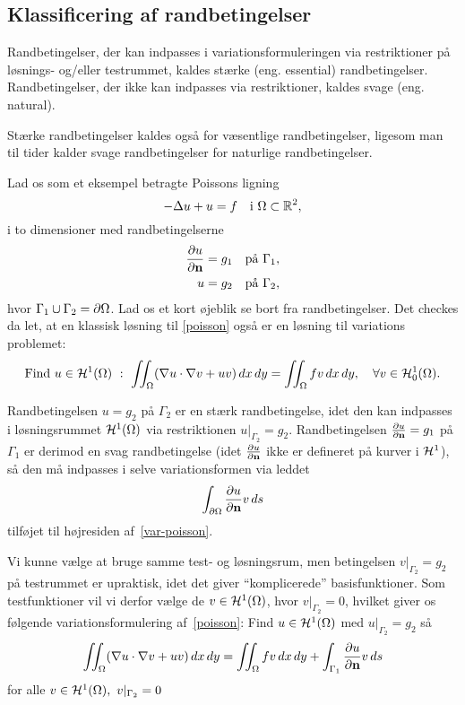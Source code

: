 \subsection{Klassificering af randbetingelser}
\begin{definition}
Randbetingelser, der kan indpasses i variationsformuleringen via
restriktioner på løsnings- og/eller testrummet, kaldes stærke (eng. essential)
randbetingelser. Randbetingelser, der ikke kan indpasses via
restriktioner, kaldes svage (eng. natural).
\end{definition}
\begin{remark}
Stærke randbetingelser kaldes også for væ\-sent\-li\-ge rand\-be\-tin\-gel\-ser,
ligesom man til tider kalder svage randbetingelser for naturlige
randbetingelser. 
\end{remark}
\begin{example}
Lad os som et eksempel betragte Poissons ligning
\begin{equation} \label{poisson}
  -\Delta u+u = f \quad \text{i $\Omega\subset\mathbb{R}^2$},
\end{equation}
i to dimensioner med randbetingelserne
\begin{align}
  \frac{\partial u}{\partial\mathbf{n}} &= g_1 \quad \text{på $\Gamma_1$}, \\
                 u  &= g_2 \quad \text{på $\Gamma_2$},
\end{align}
hvor $\Gamma_1\cup\Gamma_2 = \partial\Omega$.
Lad os et kort øjeblik se bort fra randbetingelser. Det checkes da
let, at en klassisk løsning til \eqref{poisson} også er en løsning til
variations problemet:
\begin{equation} \label{var-poisson}
  \text{Find} \
  u\in\mathcal H^1(\Omega) \ : \
  \iint_{\Omega} (\nabla u \cdot \nabla v + uv)\, dx\, dy =
  \iint_{\Omega} fv\, dx\, dy,
  \quad \forall v\in\mathcal H^1_0(\Omega).
\end{equation}

Randbetingelsen $u=g_2$ på $\Gamma_2$ er en stærk randbetingelse, idet
den kan indpasses i løsningsrummet ${\mathcal H}^1(\Omega)$ via restriktionen 
$u|_{\Gamma_2}=g_2$. Randbetingelsen $\frac{\partial u}{\partial \mathbf{n}}=g_1$ på $\Gamma_1$ er
derimod en svag randbetingelse (idet $\frac{\partial u}{\partial \mathbf{n}}$ ikke er defineret
på kurver i $\mathcal H^1$), så den må indpasses i selve variationsformen via leddet 
\begin{equation}
  \int_{\partial \Omega} \frac{\partial u}{\partial \mathbf{n}}v\, ds
\end{equation}
tilføjet til højresiden af~\eqref{var-poisson}. 

Vi kunne vælge at bruge samme test- og løsningsrum, men betingelsen
$v|_{\Gamma_2}=g_2$ på testrummet er upraktisk, idet det giver 
``komplicerede'' basisfunktioner. Som testfunktioner vil vi derfor vælge
de $v\in {\mathcal H}^1(\Omega)$, hvor $v|_{\Gamma_2}=0$, hvilket giver os følgende 
variationsformulering af~\eqref{poisson}: Find $u\in {\mathcal H}^1(\Omega)$ med $u|_{\Gamma_2}=g_2$ så
\begin{equation}
  \iint_{\Omega} (\nabla u \cdot \nabla v + uv)\, dx\, dy =
  \iint_{\Omega} fv\, dx\, dy +
  \int_{\Gamma_1} \frac{\partial u}{\partial \mathbf{n}}v\, ds
\end{equation}
for alle $v\in {\mathcal H}^1(\Omega), \ v|_{\Gamma_2}=0$


\end{example}
